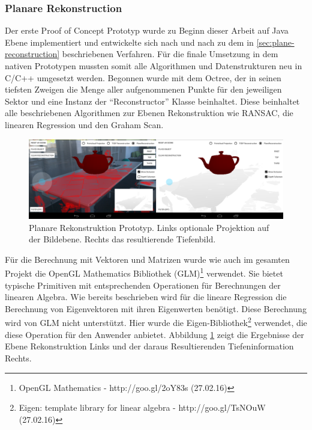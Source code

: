 \subsubsection*{Planare Rekonstruction}

Der erste Proof of Concept Prototyp wurde zu Beginn dieser Arbeit auf Java Ebene implementiert und entwickelte sich nach und nach zu dem in \ref{sec:plane-reconstruction} beschriebenen Verfahren. Für die finale Umsetzung in dem nativen Prototypen mussten somit alle Algorithmen und Datenstrukturen neu in C/C++ umgesetzt werden. Begonnen wurde mit dem Octree, der in seinen tiefsten Zweigen die Menge aller aufgenommenen Punkte für den jeweiligen Sektor und eine Instanz der \enquote{Reconstructor} Klasse beinhaltet. Diese beinhaltet alle beschriebenen Algorithmen zur Ebenen Rekonstruktion wie RANSAC, die linearen Regression und den Graham Scan. 

\begin{figure}[h]
  \centering
	\includegraphics[width=1.0\textwidth]{content/images/implementation/plane-demo.png} 
  \caption{Planare Rekonstruktion Prototyp. Links optionale Projektion auf der Bildebene. Rechts das resultierende Tiefenbild.}
  \label{fig:plane-demo}
\end{figure}

Für die Berechnung mit Vektoren und Matrizen wurde wie auch im gesamten Projekt die OpenGL Mathematics Bibliothek (GLM)\footnote{OpenGL Mathematics - http://goo.gl/2oY83s (27.02.16)} verwendet. Sie bietet typische Primitiven mit entsprechenden Operationen für Berechnungen der linearen Algebra. Wie bereits beschrieben wird für die lineare Regression die Berechnung von Eigenvektoren mit ihren Eigenwerten benötigt. Diese Berechnung wird von GLM nicht unterstützt. Hier wurde die Eigen-Bibliothek\footnote{Eigen: template library for linear algebra - http://goo.gl/TsNOuW (27.02.16)} verwendet, die diese Operation für den Anwender anbietet. Abbildung \ref{fig:plane-demo} zeigt die Ergebnisse der Ebene Rekonstruktion Links und der daraus Resultierenden Tiefeninformation Rechts.


